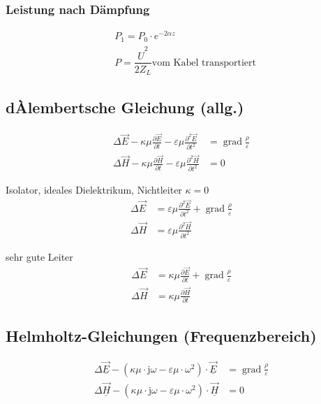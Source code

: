 \subsubsection{Leistung nach Dämpfung}
\begin{align*}
     & P_1 = P_0 \cdot e^{-2\alpha z}                              \\
     & P = \dfrac{\hat{U}^2}{2 Z_L} \text{vom Kabel transportiert}
\end{align*}

\subsection{dÀlembertsche Gleichung (allg.)}
\begin{align*}
    \Delta \vec{E}-\kappa \mu \frac{\partial \vec{E}}{\partial t}-\varepsilon \mu \frac{\partial^{2} \vec{E}}{\partial t^{2}} & = \operatorname{grad} \frac{\rho}{\varepsilon} \\
    \Delta \vec{H}-\kappa \mu \frac{\partial \vec{H}}{\partial t}-\varepsilon \mu \frac{\partial^{2} \vec{H}}{\partial t^{2}} & = 0
\end{align*}

Isolator, ideales Dielektrikum, Nichtleiter $\kappa = 0$
\begin{align*}
    \Delta \vec{E} & =\varepsilon \mu \frac{\partial^{2} \vec{E}}{\partial t^{2}}+\operatorname{grad} \frac{\rho}{\varepsilon} \\
    \Delta \vec{H} & =\varepsilon \mu \frac{\partial^{2} \vec{H}}{\partial t^{2}}
\end{align*}

sehr gute Leiter
\begin{align*}
    \Delta \vec{E} & =\kappa \mu \frac{\partial \vec{E}}{\partial t}+\operatorname{grad} \frac{\rho}{\varepsilon} \\
    \Delta \vec{H} & =\kappa \mu \frac{\partial \vec{H}}{\partial t}
\end{align*}

\subsection{Helmholtz-Gleichungen (Frequenzbereich)}
\begin{align*}
    \Delta \underline{\vec{E}}-\left(\kappa \mu \cdot \mathrm{j} \omega-\varepsilon \mu \cdot \omega^{2}\right) \cdot \underline{\vec{E}} & = \operatorname{grad} \frac{\rho}{\varepsilon} \\
    \Delta \underline{\vec{H}}-\left(\kappa \mu \cdot \mathrm{j} \omega-\varepsilon \mu \cdot \omega^{2}\right) \cdot \underline{\vec{H}} & = 0
\end{align*}

